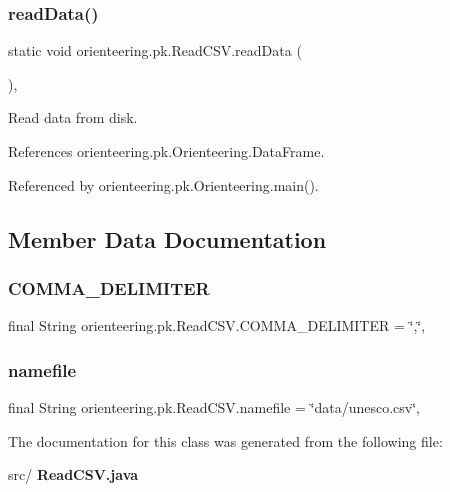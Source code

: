 \subsubsection{read\+Data()}
{\footnotesize\ttfamily static void orienteering.\+pk.\+Read\+C\+S\+V.\+read\+Data (\begin{DoxyParamCaption}{ }\end{DoxyParamCaption})\hspace{0.3cm}{\ttfamily [inline]}, {\ttfamily [static]}}



Read data from disk. 



References orienteering.\+pk.\+Orienteering.\+Data\+Frame.



Referenced by orienteering.\+pk.\+Orienteering.\+main().



\subsection{Member Data Documentation}
\mbox{\label{classorienteering_1_1pk_1_1ReadCSV_a0ce130d380f7dfece121ca9c8c55d688}} 
\subsubsection{C\+O\+M\+M\+A\+\_\+\+D\+E\+L\+I\+M\+I\+T\+ER}
{\footnotesize\ttfamily final String orienteering.\+pk.\+Read\+C\+S\+V.\+C\+O\+M\+M\+A\+\_\+\+D\+E\+L\+I\+M\+I\+T\+ER = \char`\"{},\char`\"{}\hspace{0.3cm}{\ttfamily [static]}, {\ttfamily [private]}}

\mbox{\label{classorienteering_1_1pk_1_1ReadCSV_acb5af8bdd511aac4b2bd2abf30026d19}} 
\subsubsection{namefile}
{\footnotesize\ttfamily final String orienteering.\+pk.\+Read\+C\+S\+V.\+namefile = \char`\"{}data/unesco.\+csv\char`\"{}\hspace{0.3cm}{\ttfamily [static]}, {\ttfamily [private]}}



The documentation for this class was generated from the following file\+:\begin{DoxyCompactItemize}
\item 
src/\textbf{ Read\+C\+S\+V.\+java}\end{DoxyCompactItemize}
